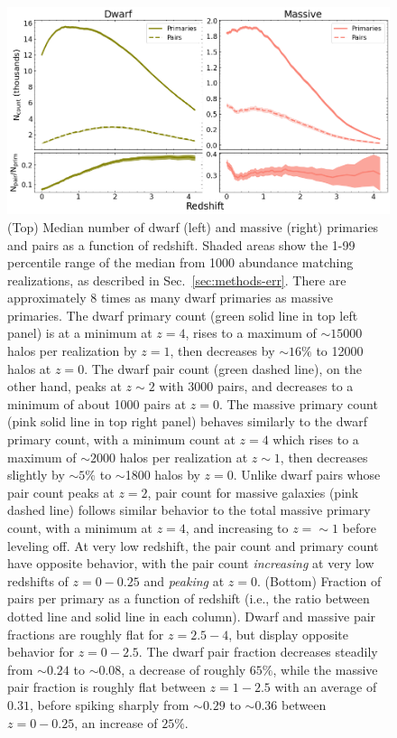 \documentclass[twocolumn]{aastex631}
\begin{document}
  \begin{figure}[htp]
    \centering
    \includegraphics[width=\textwidth]{counts_1000.png}
    \caption{(Top) Median number of dwarf (left) and massive (right) primaries and pairs as a function of redshift.
    Shaded areas show the 1-99 percentile range of the median from 1000 abundance matching realizations, as described in Sec.~\ref{sec:methods-err}.
    There are approximately 8 times as many dwarf primaries as massive primaries. 
    The dwarf primary count (green solid line in top left panel) is at a minimum at $z=4$, rises to a maximum of $\sim15000$ halos per realization by $z=1$, then decreases by $\sim16\%$ to 12000 halos at $z=0$. The dwarf pair count (green dashed line), on the other hand, peaks at $z\sim2$ with 3000 pairs, and decreases to a minimum of about 1000 pairs at $z=0$.
    The massive primary count (pink solid line in top right panel) behaves similarly to the dwarf primary count, with a minimum count at $z=4$ which rises to a maximum of $\sim2000$ halos per realization at $z\sim1$, then decreases slightly by $\sim5\%$ to $\sim$1800 halos by $z=0$. 
    Unlike dwarf pairs whose pair count peaks at $z=2$, pair count for massive galaxies (pink dashed line) follows similar behavior to the total massive primary count, with a minimum at $z=4$, and increasing to $z=\sim 1$ before leveling off. At very low redshift, the pair count and primary count have opposite behavior, with the pair count \textit{increasing} at very low redshifts of $z=0-0.25$ and \textit{peaking} at $z=0$.
    (Bottom) Fraction of pairs per primary as a function of redshift (i.e., the ratio between dotted line and solid line in each column). Dwarf and massive pair fractions are roughly flat for $z=2.5-4$, but display opposite behavior for $z=0-2.5$. The dwarf pair fraction decreases steadily from $\sim0.24$ to $\sim0.08$, a decrease of roughly $65\%$, while the massive pair fraction is roughly flat between $z=1-2.5$ with an average of $0.31$, before spiking sharply from $\sim 0.29$ to $\sim 0.36$ between $z=0-0.25$, an increase of $25\%$.}
    \label{fig:counts}
  \end{figure}
\end{document}
